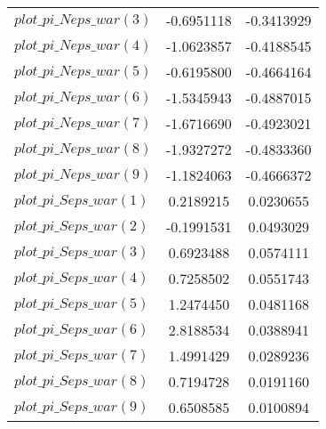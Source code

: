 \begin{center}
\begin{longtable}{lcc}
$plot\_pi\_N eps\_war (3)   $	 & 	     -0.6951118	 & 	     -0.3413929 \\ 
$plot\_pi\_N eps\_war (4)   $	 & 	     -1.0623857	 & 	     -0.4188545 \\ 
$plot\_pi\_N eps\_war (5)   $	 & 	     -0.6195800	 & 	     -0.4664164 \\ 
$plot\_pi\_N eps\_war (6)   $	 & 	     -1.5345943	 & 	     -0.4887015 \\ 
$plot\_pi\_N eps\_war (7)   $	 & 	     -1.6716690	 & 	     -0.4923021 \\ 
$plot\_pi\_N eps\_war (8)   $	 & 	     -1.9327272	 & 	     -0.4833360 \\ 
$plot\_pi\_N eps\_war (9)   $	 & 	     -1.1824063	 & 	     -0.4666372 \\ 
$plot\_pi\_S eps\_war (1)   $	 & 	      0.2189215	 & 	      0.0230655 \\ 
$plot\_pi\_S eps\_war (2)   $	 & 	     -0.1991531	 & 	      0.0493029 \\ 
$plot\_pi\_S eps\_war (3)   $	 & 	      0.6923488	 & 	      0.0574111 \\ 
$plot\_pi\_S eps\_war (4)   $	 & 	      0.7258502	 & 	      0.0551743 \\ 
$plot\_pi\_S eps\_war (5)   $	 & 	      1.2474450	 & 	      0.0481168 \\ 
$plot\_pi\_S eps\_war (6)   $	 & 	      2.8188534	 & 	      0.0388941 \\ 
$plot\_pi\_S eps\_war (7)   $	 & 	      1.4991429	 & 	      0.0289236 \\ 
$plot\_pi\_S eps\_war (8)   $	 & 	      0.7194728	 & 	      0.0191160 \\ 
$plot\_pi\_S eps\_war (9)   $	 & 	      0.6508585	 & 	      0.0100894 \\ 
\end{longtable}
 \end{center}
